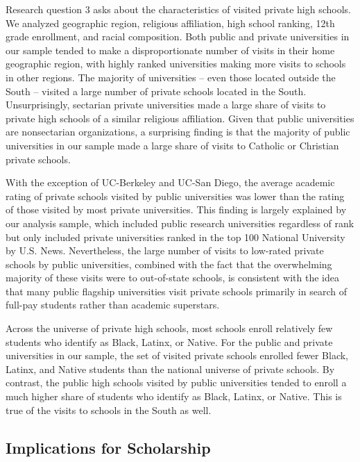 \documentclass[
  12pt,
]{article}
\begin{document}
Research question 3 asks about the characteristics of visited private high schools. We analyzed geographic region, religious affiliation, high school ranking, 12th grade enrollment, and racial composition. Both public and private universities in our sample tended to make a disproportionate number of visits in their home geographic region, with highly ranked universities making more visits to schools in other regions. The majority of universities -- even those located outside the South -- visited a large number of private schools located in the South. Unsurprisingly, sectarian private universities made a large share of visits to private high schools of a similar religious affiliation. Given that public universities are nonsectarian organizations, a surprising finding is that the majority of public universities in our sample made a large share of visits to Catholic or Christian private schools.

With the exception of UC-Berkeley and UC-San Diego, the average academic rating of private schools visited by public universities was lower than the rating of those visited by most private universities. This finding is largely explained by our analysis sample, which included public research universities regardless of rank but only included private universities ranked in the top 100 National University by U.S. News. Nevertheless, the large number of visits to low-rated private schools by public universities, combined with the fact that the overwhelming majority of these visits were to out-of-state schools, is consistent with the idea that many public flagship universities visit private schools primarily in search of full-pay students rather than academic superstars.

Across the universe of private high schools, most schools enroll relatively few students who identify as Black, Latinx, or Native. For the public and private universities in our sample, the set of visited private schools enrolled fewer Black, Latinx, and Native students than the national universe of private schools. By contrast, the public high schools visited by public universities tended to enroll a much higher share of students who identify as Black, Latinx, or Native. This is true of the visits to schools in the South as well.

\subsection{Implications for Scholarship}\label{implications-for-scholarship}
\end{document}
